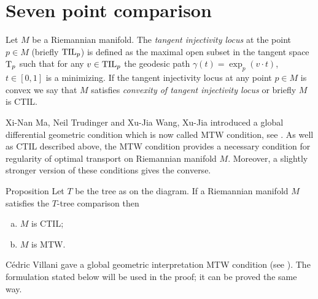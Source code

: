 \section{Seven point comparison}

Let $M$ be a Riemannian manifold.
The \emph{tangent injectivity locus} at the point $p\in M$ (briefly $\mathrm{\rm TIL}_p$) is defined as the maximal open subset in the tangent space $\mathrm{T}_p$ such that for any $v\in\mathrm{\rm TIL}_p$ the geodesic path $\gamma(t)=\exp_p(v\cdot t)$, $t\in [0,1]$ is a minimizing.
If the tangent injectivity locus at any point $p\in M$ is convex we say that $M$ satisfies \emph{convexity of  tangent injectivity locus} or briefly $M$ is CTIL.

Xi-Nan Ma, Neil Trudinger and Xu-Jia Wang, Xu-Jia introduced a global differential geometric condition which is now called MTW condition, see \cite{MTW}.
As well as CTIL described above, the MTW condition provides a necessary condition for regularity of optimal transport on Riemannian manifold $M$.
Moreover, a slightly stronger version of these conditions gives the converse.

{

\begin{wrapfigure}[6]{r}{24 mm}
\end{wrapfigure}

\begin{thm}{Proposition}\label{T=>CTIL+MTW}
Let $T$ be the tree as on the diagram.
If a Riemannian manifold $M$ satisfies the $T$-tree comparison then 
\begin{enumerate}[(a)]
\item\label{T=>CTIL:CTIL} $M$ is CTIL;
\item\label{T=>CTIL:MTW} $M$ is MTW.
\end{enumerate}

\end{thm}

Cédric Villani gave a global geometric interpretation MTW condition (see \cite[2.6]{MTW+CTIL}). 
The formulation stated below will be used in the proof; 
it can be proved the same way.

}

